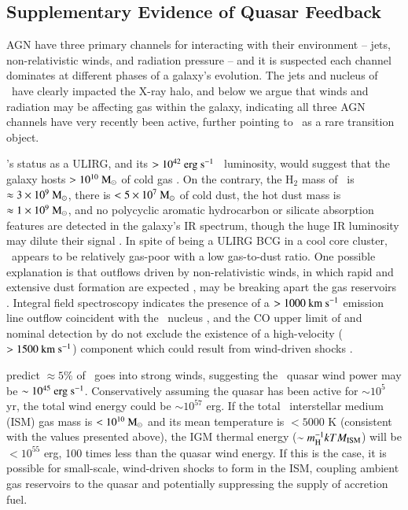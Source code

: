 \documentclass[referee,traditabstract]{aa}
\begin{document}
\subsection{Supplementary Evidence of Quasar Feedback}

AGN have three primary channels for interacting with their environment
-- jets, non-relativistic winds, and radiation pressure -- and it is
suspected each channel dominates at different phases of a galaxy's
evolution. The jets and nucleus of \irs\ have clearly impacted the
X-ray halo, and below we argue that winds and radiation may be
affecting gas within the galaxy, indicating all three AGN channels
have very recently been active, further pointing to \irs\ as a rare
transition object.

\irs's status as a ULIRG, and its $> 10^{42} ~\rm{\mbox{\ensuremath{\rm{erg}}}~\ensuremath{\rm{\mbox{\ensuremath{\rm{s}}}^{-1}}}}$
\halpha\ luminosity, would suggest that the galaxy hosts $> 10^{10}
~\rm{M_{\odot}}$ of cold gas \citep[\eg][]{1988ApJ...325...74S, edge01}. On the
contrary, the H$_2$ mass of \irs\ is $\approx 3 \times 10^{9} ~\rm{M_{\odot}}$,
there is $< 5 \times 10^7 ~\rm{M_{\odot}}$ of cold dust, the hot dust mass is
$\approx 1 \times 10^9 ~\rm{M_{\odot}}$, and no polycyclic aromatic hydrocarbon
or silicate absorption features are detected in the galaxy's IR
spectrum, though the huge IR luminosity may dilute their signal
\citep{1997A&A...318L...1T, 2004ApJ...613..986P, 2008ApJ...683..114S,
  2010arXiv1009.2040C}. In spite of being a ULIRG BCG in a cool core
cluster, \irs\ appears to be relatively gas-poor with a low
gas-to-dust ratio. One possible explanation is that outflows driven by
non-relativistic winds, in which rapid and extensive dust formation
are expected \citep{2002ApJ...567L.107E}, may be breaking apart the
gas reservoirs \citep[\eg][]{2010MNRAS.401....7H}. Integral field
spectroscopy indicates the presence of a $> 1000 ~\rm{\mbox{\ensuremath{\rm{km}}}~\ensuremath{\rm{\mbox{\ensuremath{\rm{s}}}^{-1}}}}$ emission line
outflow coincident with the \irs\ nucleus \citep{1996MNRAS.283.1003C},
and the CO upper limit of \citet{1998ApJ...506..205E} and nominal
detection by \citet{2010arXiv1009.2040C} do not exclude the existence
of a high-velocity ($> 1500 ~\rm{\mbox{\ensuremath{\rm{km}}}~\ensuremath{\rm{\mbox{\ensuremath{\rm{s}}}^{-1}}}}$) component which could result from
wind-driven shocks \citep[\eg][]{2010A&A...518L.155F}.  

\citet{2005ApJ...619...60L} predict $\approx 5\%$ of \lqso\ goes into
strong winds, suggesting the \irs\ quasar wind power may be $\sim
10^{45} ~\rm{\mbox{\ensuremath{\rm{erg}}}~\ensuremath{\rm{\mbox{\ensuremath{\rm{s}}}^{-1}}}}$. Conservatively assuming the quasar has been active for
$\sim 10^5$ yr, the total wind energy could be $\sim 10^{57}$ erg. If
the total \irs\ interstellar medium (ISM) gas mass is $< 10^{10}
~\rm{M_{\odot}}$ and its mean temperature is $< 5000$ K (consistent with the
values presented above), the IGM thermal energy ($\sim m_{\rm{H}}^{-1} kT
M_{\rm{ISM}}$) will be $< 10^{55}$ erg, 100 times less than the quasar
wind energy. If this is the case, it is possible for small-scale,
wind-driven shocks to form in the ISM, coupling ambient gas reservoirs
to the quasar and potentially suppressing the supply of accretion
fuel.
\end{document}
